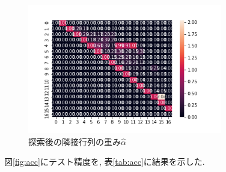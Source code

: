 \documentclass[twocolumn]{jarticle}     %
\begin{document}
\begin{figure}[tb]
	\begin{center}
		\includegraphics[clip,width=85mm]{alpha_50.png}
		\caption{探索後の隣接行列の重み$\hat{\alpha}$}
		\label{fig:alpha}
	\end{center}
\end{figure}

図\ref{fig:acc}にテスト精度を, 表\ref{tab:acc}に結果を示した.
\end{document}
